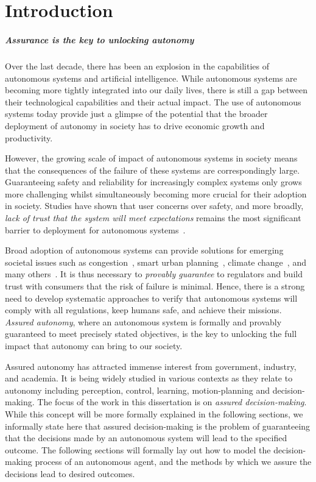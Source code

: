 \chapter{Introduction}

\paragraph{Assurance is the key to unlocking autonomy} Over the last decade, there has been an explosion in the capabilities of autonomous systems and artificial intelligence. While autonomous systems are becoming more tightly integrated into our daily lives, there is still a gap between their technological capabilities and their actual impact. The use of autonomous systems today provide just a glimpse of the potential that the broader deployment of autonomy in society has to drive economic growth and productivity. 

However, the growing scale of impact of autonomous systems in society means that the consequences of the failure of these systems are correspondingly large. Guaranteeing safety and reliability for increasingly complex systems only grows more challenging whilst simultaneously becoming more crucial for their adoption in society. Studies have shown that user concerns over safety, and more broadly, \emph{lack of trust that the system will meet expectations} remains the most significant barrier to deployment for autonomous systems~\cite{KAUR201887,BEZAI202165,MOLNAR2018319}.  

Broad adoption of autonomous systems can provide solutions for emerging societal issues such as congestion~\cite{LIORIS2017292,8734238}, smart urban planning~\cite{GULSRUD201885,NITOSLAWSKI2019101770}, climate change~\cite{KOLOKOTSA2017101,goddard2021global}, and many others~\cite{DUONG2020355}. It is thus necessary to \emph{provably guarantee} to regulators and build trust with consumers that the risk of failure is minimal. Hence, there is a strong need to develop systematic approaches to verify that autonomous systems will comply with all regulations, keep humans safe, and achieve their missions. \emph{Assured autonomy}, where an autonomous system is formally and provably guaranteed to meet precisely stated objectives, is the key to unlocking the full impact that autonomy can bring to our society. 

Assured autonomy has attracted immense interest from government, industry, and academia. It is being widely studied in various contexts as they relate to autonomy including perception, control, learning, motion-planning and decision-making. The focus of the work in this dissertation is on \emph{assured decision-making}. While this concept will be more formally explained in the following sections, we informally state here that assured decision-making is the problem of guaranteeing that the decisions made by an autonomous system will lead to the specified outcome. The following sections will formally lay out how to model the decision-making process of an autonomous agent, and the methods by which we assure the decisions lead to desired outcomes. 



